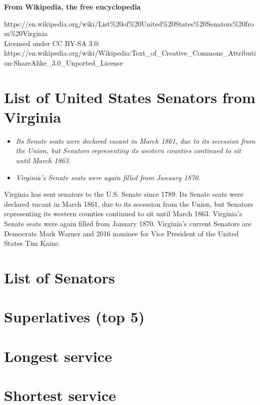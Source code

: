 \textbf{From Wikipedia, the free encyclopedia}

https://en.wikipedia.org/wiki/List\%20of\%20United\%20States\%20Senators\%20from\%20Virginia\\
Licensed under CC BY-SA 3.0:\\
https://en.wikipedia.org/wiki/Wikipedia:Text\_of\_Creative\_Commons\_Attribution-ShareAlike\_3.0\_Unported\_License

\section{List of United States Senators from
Virginia}\label{list-of-united-states-senators-from-virginia}

\begin{itemize}
\item
  \emph{Its Senate seats were declared vacant in March 1861, due to its
  secession from the Union, but Senators representing its western
  counties continued to sit until March 1863.}
\item
  \emph{Virginia's Senate seats were again filled from January 1870.}
\end{itemize}

Virginia has sent senators to the U.S. Senate since 1789. Its Senate
seats were declared vacant in March 1861, due to its secession from the
Union, but Senators representing its western counties continued to sit
until March 1863. Virginia's Senate seats were again filled from January
1870. Virginia's current Senators are Democrats Mark Warner and 2016
nominee for Vice President of the United States Tim Kaine.

\section{List of Senators}\label{list-of-senators}

\section{Superlatives (top 5)}\label{superlatives-top-5}

\section{Longest service}\label{longest-service}

\section{Shortest service}\label{shortest-service}


